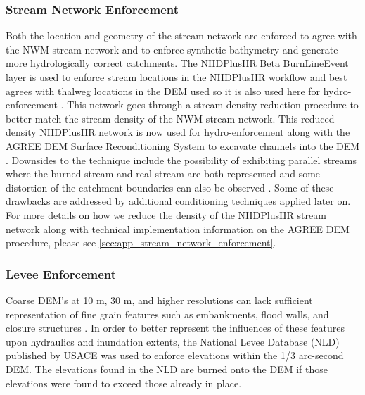 \documentclass[draft]{dependencies/agujournal2019}
\begin{document}
\subsubsection{Stream Network Enforcement} 
\label{ssec:stream_network_enforcement}
%
Both the location and geometry of the stream network are enforced to agree with the NWM stream network and to enforce synthetic bathymetry and generate more hydrologically correct catchments.
The NHDPlusHR Beta BurnLineEvent layer is used to enforce stream locations in the NHDPlusHR workflow and best agrees with thalweg locations in the DEM used so it is also used here for hydro-enforcement \cite{moore2019user}. 
This network goes through a stream density reduction procedure to better match the stream density of the NWM stream network.
This reduced density NHDPlusHR network is now used for hydro-enforcement along with the AGREE DEM Surface Reconditioning System to excavate channels into the DEM \cite{hellweger1997agree}.
Downsides to the technique include the possibility of exhibiting parallel streams where the burned stream and real stream are both represented \cite{hellweger1997agree,saunders1999preparation} and some distortion of the catchment boundaries can also be observed \cite{saunders1999preparation,saunders1996gis}.
Some of these drawbacks are addressed by additional conditioning techniques applied later on.
For more details on how we reduce the density of the NHDPlusHR stream network along with technical implementation information on the AGREE DEM procedure, please see \ref{sec:app_stream_network_enforcement}.
%
\subsubsection{Levee Enforcement}
%
Coarse DEM's at 10 m, 30 m, and higher resolutions can lack sufficient representation of fine grain features such as embankments, flood walls, and closure structures \cite{arundel2018assimilation,dobbs2010evaluation,wang2005comparison,sanders2007evaluation}.
In order to better represent the influences of these features upon hydraulics and inundation extents, the National Levee Database (NLD) published by USACE was used to enforce elevations within the 1/3 arc-second DEM.
The elevations found in the NLD are burned onto the DEM if those elevations were found to exceed those already in place.
%
\end{document}
